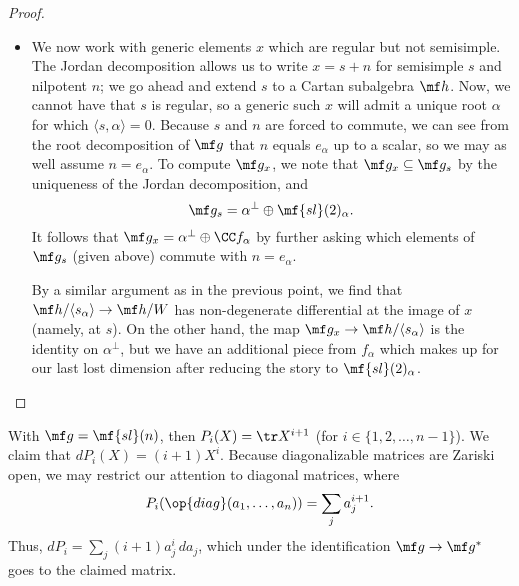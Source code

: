 \documentclass[../notes.tex]{subfiles}
\begin{document}
\begin{proof}
\begin{itemize}
		\item We now work with generic elements $x$ which are regular but not semisimple. The Jordan decomposition allows us to write $x=s+n$ for semisimple $s$ and nilpotent $n$; we go ahead and extend $s$ to a Cartan subalgebra $\mf h$. Now, we cannot have that $s$ is regular, so a generic such $x$ will admit a unique root $\alpha$ for which $\langle s,\alpha\rangle=0$. Because $s$ and $n$ are forced to commute, we can see from the root decomposition of $\mf g$ that $n$ equals $e_\alpha$ up to a scalar, so we may as well assume $n=e_\alpha$. To compute $\mf g_x$, we note that $\mf g_x\subseteq\mf g_s$ by the uniqueness of the Jordan decomposition, and
		\[\mf g_s=\alpha^\perp\oplus\mf{sl}(2)_\alpha.\]
		It follows that $\mf g_x=\alpha^\perp\oplus\CC f_\alpha$ by further asking which elements of $\mf g_s$ (given above) commute with $n=e_\alpha$.


		By a similar argument as in the previous point, we find that $\mf h/\langle s_\alpha\rangle\to\mf h/W$ has non-degenerate differential at the image of $x$ (namely, at $s$). On the other hand, the map $\mf g_x\to\mf h/\langle s_\alpha\rangle$ is the identity on $\alpha^\perp$, but we have an additional piece from $f_\alpha$ which makes up for our last lost dimension after reducing the story to $\mf{sl}(2)_\alpha$.
		\qedhere
	\end{itemize}
\end{proof}
\begin{example}
	With $\mf g=\mf{sl}(n)$, then $P_i(X)=\tr X^{i+1}$ (for $i\in\{1,2,\ldots,n-1\}$). We claim that $dP_i(X)=(i+1)X^i$. Because diagonalizable matrices are Zariski open, we may restrict our attention to diagonal matrices, where
	\[P_i(\op{diag}(a_1,\ldots,a_n))=\sum_ja_j^{i+1}.\]
	Thus, $dP_i=\sum_j(i+1)a_j^i\,da_j$, which under the identification $\mf g\to\mf g^*$ goes to the claimed matrix.
\end{example}
\end{document}
